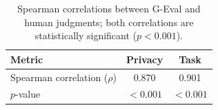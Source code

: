 \begin{table}[t]
\centering
\footnotesize
\setlength{\tabcolsep}{4pt}
\begin{tabular}{@{}p{}cc@{}}
\toprule
\textbf{Metric} & \textbf{Privacy} & \textbf{Task} \\
\midrule
Spearman correlation ($\rho$) & 0.870 & 0.901 \\
$p$-value & $<0.001$ & $<0.001$ \\
\bottomrule
\end{tabular}
\caption{Spearman correlations between G-Eval and human judgments; both correlations are statistically significant ($p < 0.001$).}
\label{tab:correlation}
\end{table}